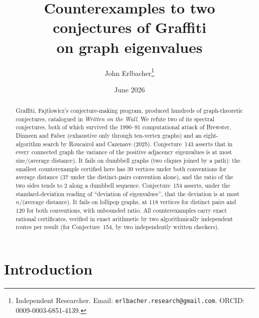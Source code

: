 \documentclass[11pt]{article}
\title{Counterexamples to two conjectures of Graffiti\\ on graph eigenvalues}
\author{John Erlbacher\thanks{Independent Researcher. Email: \texttt{erlbacher.research@gmail.com}. ORCID: 0009-0003-6851-4139.}}
\date{June 2026}
\theoremstyle{remark}
\begin{document}
\maketitle

\begin{abstract}
Graffiti, Fajtlowicz's conjecture-making program, produced hundreds of
graph-theoretic conjectures, catalogued in \emph{Written on the Wall}. We
refute two of its spectral conjectures, both of which survived the 1990--91
computational attack of Brewster, Dinneen and Faber (exhaustive only through
ten-vertex graphs) and an eight-algorithm search by Roucairol and
Cazenave (2025). Conjecture~143 asserts that in every
connected graph the variance of the positive adjacency eigenvalues is at most
size/(average distance). It fails on dumbbell graphs (two cliques joined by a
path): the smallest counterexample certified here has $39$ vertices under
both conventions for average distance ($37$ under the distinct-pairs
convention alone), and the ratio of the two
sides tends to $2$ along a dumbbell sequence. Conjecture~154 asserts, under
the standard-deviation reading of ``deviation of eigenvalues'', that the
deviation is at most $n$/(average distance). It fails on lollipop graphs, at
$118$ vertices for distinct pairs and $120$ for both conventions, with
unbounded ratio. All counterexamples carry exact rational certificates,
verified in exact arithmetic by two algorithmically independent routes per
result (for Conjecture~154, by two independently written checkers).
\end{abstract}

\section{Introduction}\label{sec:intro}
\end{document}
